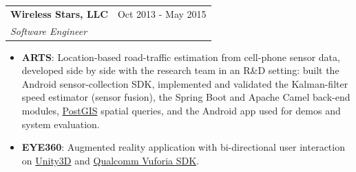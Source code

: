 \documentclass[letterpaper,11pt]{article}
\makeatletter
\newcommand{\resumeItem}[2]{
  \item\small{
    \textbf{#1}{: #2\vspace{-2pt}}
  }
}
\newcommand{\resumeSubheading}[4]{
  \vspace{-1pt}\item
    \begin{tabular*}{0.97\textwidth}[t]{l@{\extracolsep{\fill}}r}
      \textbf{#1} & #2 \\
      \textit{\small #3} & \textit{\small #4} \\
    \end{tabular*}\vspace{-5pt}
}
\newcommand{\resumeItemListStart}{\begin{itemize}}
\newcommand{\resumeItemListEnd}{\end{itemize}\vspace{-5pt}}
\makeatother
\begin{document}
    \resumeSubheading
      {Wireless Stars, LLC}{Oct 2013 - May 2015}
      {Software Engineer}{}
      \resumeItemListStart
        \resumeItem{ARTS}
          {Location-based road-traffic estimation from cell-phone sensor data, developed side by side with the research team in an R\&D setting: built the Android sensor-collection SDK, implemented and validated the Kalman-filter speed estimator (sensor fusion), the Spring Boot and Apache Camel back-end modules, \href{https://postgis.net/}{PostGIS} spatial queries, and the Android app used for demos and system evaluation.}
        \resumeItem{EYE360}
          {Augmented reality application with bi-directional user interaction on \href{https://unity.com/}{Unity3D} and \href{https://www.qualcomm.com/news/releases/2014/09/qualcomm-announces-vuforia-digital-eyewear-powering-next-generation}{Qualcomm Vuforia SDK}.}
      \resumeItemListEnd

      
\end{document}
